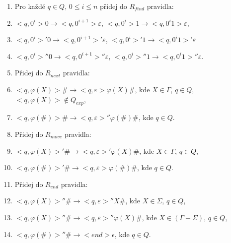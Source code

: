 \begin{Alg}
\begin{list}{}{\setlength\parsep{0cm} \setlength\itemsep{0cm} \setlength\leftmargin{1em}}
\begin{enumerate}

  \item Pro každé $q \in Q$, $0 \le i \le n$ přidej do $R_{find}$ pravidla:

\renewcommand{\labelenumi}{(\roman{enumi})}

  \item $<q, 0^i> 0 \rightarrow <q, 0^{i+1}> \varepsilon $, $<q, 0^i> 1 \rightarrow <q, 0^i 1> \varepsilon $,
  \item $<q, 0^i>' 0 \rightarrow <q, 0^{i+1}>' \varepsilon $, $<q, 0^i>' 1 \rightarrow <q, 0^i 1>' \varepsilon $
  \item $<q, 0^i>'' 0 \rightarrow <q, 0^{i+1}>'' \varepsilon $, $<q, 0^i>'' 1 \rightarrow <q, 0^i 1>'' \varepsilon $.



  \item Přidej do $R_{next}$ pravidla:

\renewcommand{\labelenumi}{(\roman{enumi})}

  \item $<q, \varphi(X)> \# \rightarrow <q, \varepsilon> \varphi(X) \# $, kde $X \in \Gamma$, $q \in Q$, $<q, \varphi(X)> \notin Q_{exp}$,
  \item $<q, \varphi(\#) > \# \rightarrow <q, \varepsilon>'' \varphi(\#) \# $, kde $q \in Q$.


  \item Přidej do $R_{move}$ pravidla:

\renewcommand{\labelenumi}{(\roman{enumi})}

  \item $<q, \varphi(X)>' \# \rightarrow <q, \varepsilon>' \varphi(X) \# $, kde $X \in \Gamma$, $q \in Q$,
  \item $<q, \varphi(\#) >' \# \rightarrow <q, \varepsilon> \varphi(\#) \# $, kde $q \in Q$.


  \item Přidej do $R_{end}$ pravidla:

\renewcommand{\labelenumi}{(\roman{enumi})}

  \item $<q, \varphi(X) >'' \# \rightarrow <q, \varepsilon>'' X \# $, kde $X \in \Sigma$, $q \in Q$,
  \item $<q, \varphi(X) >'' \# \rightarrow <q, \varepsilon>'' \varphi(X) \# $, kde $X \in (\Gamma - \Sigma)$, $q \in Q$,
  \item $<q, \varphi(\#) >'' \# \rightarrow <end> \epsilon $, kde $q \in Q$.

\end{enumerate}

\end{list}
\end{Alg}

